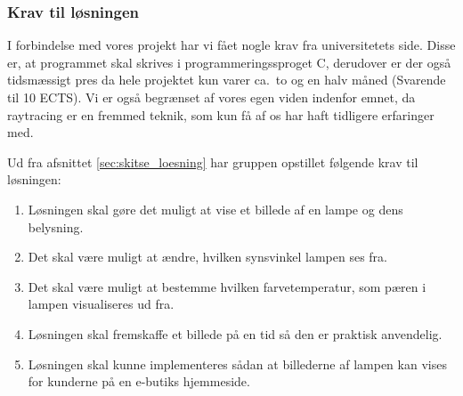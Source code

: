 \subsubsection{Krav til løsningen}
\label{sec:krav}

I forbindelse med vores projekt har vi fået nogle krav fra universitetets side. Disse er, at programmet skal skrives i programmeringssproget C, derudover er der også tidsmæssigt pres da hele projektet kun varer ca.\ to og en halv måned (Svarende til 10 ECTS). 
Vi er også begrænset af vores egen viden indenfor emnet, da raytracing er en fremmed teknik, som kun få af os har haft tidligere erfaringer med. 

Ud fra afsnittet \ref{sec:skitse_loesning} har gruppen opstillet følgende krav til løsningen:
\begin{enumerate}
    \item Løsningen skal gøre det muligt at vise et billede af en lampe og dens belysning.
    \item Det skal være muligt at ændre, hvilken synsvinkel lampen ses fra.
    \item Det skal være muligt at bestemme hvilken farvetemperatur, som pæren i lampen visualiseres ud fra.
    \item Løsningen skal fremskaffe et billede på en tid så den er praktisk anvendelig.
    \item Løsningen skal kunne implementeres sådan at billederne af lampen kan vises for kunderne på en e-butiks hjemmeside.
\end{enumerate}